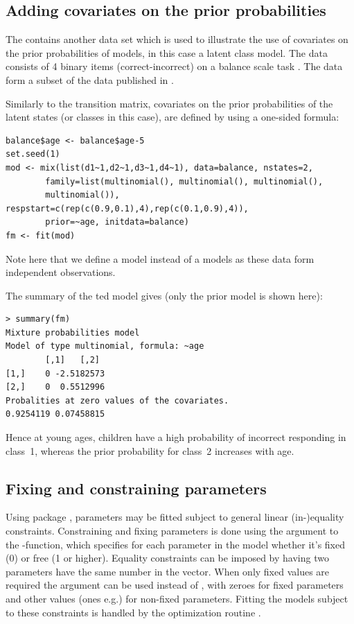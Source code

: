 \documentclass[article]{jss}
\begin{document}
\subsection{Adding covariates on the prior probabilities}

The  contains another data set which is used to
illustrate the use of covariates on the prior probabilities of models,
in this case a latent class model. The  data consists 
of 4 binary items (correct-incorrect) on a balance scale task 
\citet{Siegler1981}. The data form a subset of the data published in 
\citet{Jansen2002}. 

Similarly to the transition matrix, covariates on the prior 
probabilities of the latent states (or classes in this case), are 
defined by using a one-sided formula: 
\begin{verbatim}
balance$age <- balance$age-5
set.seed(1)
mod <- mix(list(d1~1,d2~1,d3~1,d4~1), data=balance, nstates=2,
        family=list(multinomial(), multinomial(), multinomial(),
		multinomial()), respstart=c(rep(c(0.9,0.1),4),rep(c(0.1,0.9),4)), 
		prior=~age, initdata=balance)
fm <- fit(mod)
\end{verbatim}
Note here that we define a  model instead of a 
models as these data form independent observations.

The summary of the ted model gives (only the prior model is 
shown here): 
\begin{verbatim}
> summary(fm)
Mixture probabilities model 
Model of type multinomial, formula: ~age
		[,1]   [,2]
[1,]    0 -2.5182573
[2,]    0  0.5512996
Probalities at zero values of the covariates.
0.9254119 0.07458815 
\end{verbatim}	
Hence at young ages, children have a high probability of incorrect 
responding in class~1, whereas the prior probability for class~2 
increases with age. 


\subsection{Fixing and constraining parameters}

Using package , parameters may be fitted subject to
general linear (in-)equality constraints.  Constraining and fixing
parameters is done using the  argument to the
-function, which specifies for each parameter in the
model whether it's fixed (0) or free (1 or higher).  Equality
constraints can be imposed by having two parameters have the same
number in the  vector.  When only fixed values are
required the  argument can be used instead of
, with zeroes for fixed parameters and other values (ones
e.g.) for non-fixed parameters.  Fitting the models subject to these
constraints is handled by the optimization routine .
\end{document}
